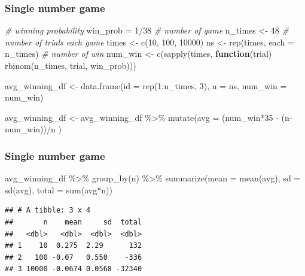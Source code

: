 \documentclass[
  ignorenonframetext,
]{beamer}
\newenvironment{Shaded}{\begin{snugshade}}{\end{snugshade}}
\newcommand{\AttributeTok}[1]{\textcolor[rgb]{0.77,0.63,0.00}{#1}}
\newcommand{\CommentTok}[1]{\textcolor[rgb]{0.56,0.35,0.01}{\textit{#1}}}
\newcommand{\ControlFlowTok}[1]{\textcolor[rgb]{0.13,0.29,0.53}{\textbf{#1}}}
\newcommand{\DecValTok}[1]{\textcolor[rgb]{0.00,0.00,0.81}{#1}}
\newcommand{\FunctionTok}[1]{\textcolor[rgb]{0.00,0.00,0.00}{#1}}
\newcommand{\NormalTok}[1]{#1}
\newcommand{\OtherTok}[1]{\textcolor[rgb]{0.56,0.35,0.01}{#1}}
\newcommand{\SpecialCharTok}[1]{\textcolor[rgb]{0.00,0.00,0.00}{#1}}
\begin{document}
\begin{frame}[fragile]
\frametitle{Single number game}
\tiny

\begin{Shaded}
\begin{Highlighting}[]
\CommentTok{\# winning probability}
\NormalTok{win\_prob }\OtherTok{=} \DecValTok{1}\SpecialCharTok{/}\DecValTok{38}
\CommentTok{\# number of game}
\NormalTok{n\_times }\OtherTok{\textless{}{-}} \DecValTok{48}
\CommentTok{\# number of trials each game}
\NormalTok{times }\OtherTok{\textless{}{-}} \FunctionTok{c}\NormalTok{(}\DecValTok{10}\NormalTok{, }\DecValTok{100}\NormalTok{, }\DecValTok{10000}\NormalTok{)}
\NormalTok{ns }\OtherTok{\textless{}{-}} \FunctionTok{rep}\NormalTok{(times, }\AttributeTok{each =}\NormalTok{ n\_times)}
\CommentTok{\# number of win}
\NormalTok{num\_win }\OtherTok{\textless{}{-}} \FunctionTok{c}\NormalTok{(}\FunctionTok{sapply}\NormalTok{(times, }
                  \ControlFlowTok{function}\NormalTok{(trial) }\FunctionTok{rbinom}\NormalTok{(n\_times, trial, win\_prob)))}

\NormalTok{avg\_winning\_df }\OtherTok{\textless{}{-}} \FunctionTok{data.frame}\NormalTok{(}\AttributeTok{id =} \FunctionTok{rep}\NormalTok{(}\DecValTok{1}\SpecialCharTok{:}\NormalTok{n\_times, }\DecValTok{3}\NormalTok{),}
                             \AttributeTok{n =}\NormalTok{ ns,}
                             \AttributeTok{num\_win =}\NormalTok{ num\_win)}

\NormalTok{avg\_winning\_df }\OtherTok{\textless{}{-}} 
\NormalTok{  avg\_winning\_df }\SpecialCharTok{\%\textgreater{}\%}
  \FunctionTok{mutate}\NormalTok{(}\AttributeTok{avg =}\NormalTok{ (num\_win}\SpecialCharTok{*}\DecValTok{35} \SpecialCharTok{{-}}\NormalTok{ (n}\SpecialCharTok{{-}}\NormalTok{num\_win))}\SpecialCharTok{/}\NormalTok{n )}
\end{Highlighting}
\end{Shaded}
\end{frame}

\begin{frame}[fragile]
\frametitle{Single number game}

\begin{Shaded}
\begin{Highlighting}[]
\NormalTok{avg\_winning\_df }\SpecialCharTok{\%\textgreater{}\%}
  \FunctionTok{group\_by}\NormalTok{(n) }\SpecialCharTok{\%\textgreater{}\%}
  \FunctionTok{summarize}\NormalTok{(}\AttributeTok{mean =} \FunctionTok{mean}\NormalTok{(avg),}
            \AttributeTok{sd =} \FunctionTok{sd}\NormalTok{(avg),}
            \AttributeTok{total =} \FunctionTok{sum}\NormalTok{(avg}\SpecialCharTok{*}\NormalTok{n))}
\end{Highlighting}
\end{Shaded}

\begin{verbatim}
## # A tibble: 3 x 4
##       n    mean     sd  total
##   <dbl>   <dbl>  <dbl>  <dbl>
## 1    10  0.275  2.29      132
## 2   100 -0.07   0.550    -336
## 3 10000 -0.0674 0.0568 -32340
\end{verbatim}
\end{frame}
\end{document}

